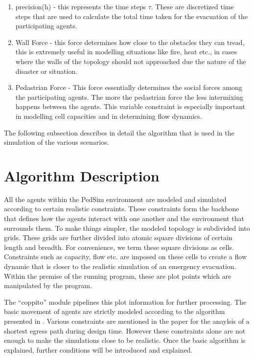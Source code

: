 \begin{enumerate}
  \item precision(h) - this represents the time steps $\tau$. These are discretized time steps that are used to calculate the total time taken for the evacuation of the participating agents.
  \item Wall Force - this force determines how close to the obstacles they can tread, this is extremely useful in modelling situations like fire, heat etc., in cases where the walls of the topology should not approached due the nature of the disaster or situation.
  \item Pedastrian Force - This force essentially determines the social forces among the participating agents. The more the pedastrian force the less intermixing happens between the agents. This variable constraint is especially important in modelling cell capacities and in determining flow dynamics. 
\end{enumerate}

The following subsection describes in detail the algorithm that is used in the simulation of the various scenarios. 


\section{Algorithm Description}
\label{sec: Algorithm Description}

All the agents within the PedSim environment are modeled and simulated according to certain realistic constraints. These constraints form the backbone that defines how the agents interact with one another and the environment that surrounds them. To make things simpler, the modeled topology is subdivided into grids. These grids are further divided into atomic square divisions of certain length and breadth. For convenience, we term these square divisions as cells. Constraints such as capacity, flow etc. are imposed on these cells to create a flow dynamic that is closer to the realistic simulation of an emergency evacuation. Within the premise of the running program, these are plot points which are manipulated by the program. 

The “coppito” module pipelines this plot information for further processing. The basic movement of agents are strictly modeled according to the algorithm presented in \cite{ref5}. Various constraints are mentioned in the paper for the anaylsis of a shortest egress path during design time. However these constraints alone are not enough to make the simulations close to be realistic. Once the basic algorithm is explained, further conditions will be introduced and explained. 


